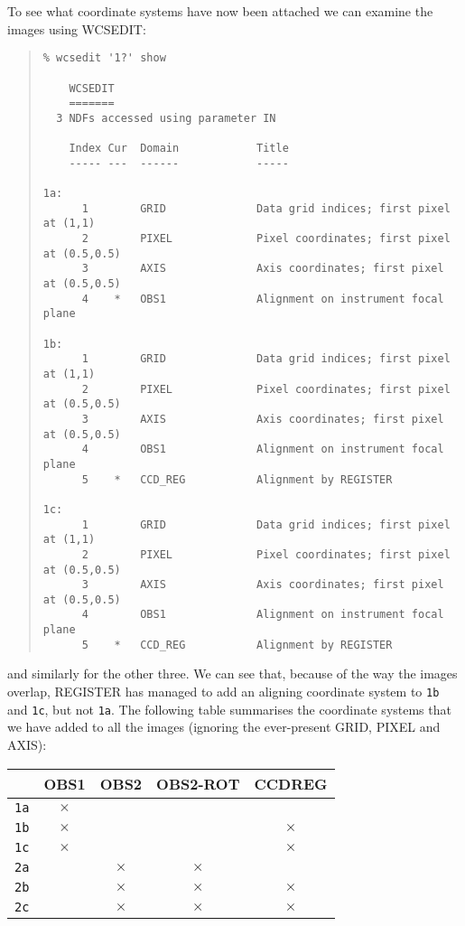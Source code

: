 \documentclass[twoside,11pt]{article}
\newcommand{\htmlref}[2]{#1}
\renewcommand{\_}{\texttt{\symbol{95}}}
\newenvironment{myquote}{\begin{quote}\begin{small}}{\end{small}\end{quote}}
\newcommand{\text}[1]{{\small \tt #1}}
\newcommand{\routine}[1]{{\sc #1}}
\newcommand{\xroutine}[1]{\htmlref{{\sc #1}}{#1}}
\begin{document}
To see what coordinate systems have now been attached we 
can examine the images using \xroutine{WCSEDIT}:
\begin{myquote}
\begin{verbatim}
% wcsedit '1?' show

    WCSEDIT
    =======
  3 NDFs accessed using parameter IN

    Index Cur  Domain            Title
    ----- ---  ------            -----

1a:
      1        GRID              Data grid indices; first pixel at (1,1)
      2        PIXEL             Pixel coordinates; first pixel at (0.5,0.5)
      3        AXIS              Axis coordinates; first pixel at (0.5,0.5)
      4    *   OBS1              Alignment on instrument focal plane

1b:
      1        GRID              Data grid indices; first pixel at (1,1)
      2        PIXEL             Pixel coordinates; first pixel at (0.5,0.5)
      3        AXIS              Axis coordinates; first pixel at (0.5,0.5)
      4        OBS1              Alignment on instrument focal plane
      5    *   CCD_REG           Alignment by REGISTER

1c:
      1        GRID              Data grid indices; first pixel at (1,1)
      2        PIXEL             Pixel coordinates; first pixel at (0.5,0.5)
      3        AXIS              Axis coordinates; first pixel at (0.5,0.5)
      4        OBS1              Alignment on instrument focal plane
      5    *   CCD_REG           Alignment by REGISTER
\end{verbatim}
\end{myquote}
and similarly for the other three.
We can see that, because of the way the images overlap,
\routine{REGISTER} has managed to add an aligning coordinate system 
to \text{1b} and \text{1c}, but not \text{1a}.
The following table summarises the coordinate systems that we have 
added to all the images (ignoring the ever-present GRID, PIXEL and AXIS):
\begin{center}
\begin{tabular}{l|c|c|c|c|}
           & OBS1     & OBS2     & OBS2-ROT & CCD\_REG \\
\hline
\text{1a} & $\times$ &          &          &          \\
\hline
\text{1b} & $\times$ &          &          & $\times$ \\
\hline
\text{1c} & $\times$ &          &          & $\times$ \\
\hline
\text{2a} &          & $\times$ & $\times$ &          \\
\hline
\text{2b} &          & $\times$ & $\times$ & $\times$ \\
\hline
\text{2c} &          & $\times$ & $\times$ & $\times$ \\
\hline
\end{tabular}
\end{center}
\end{document}

